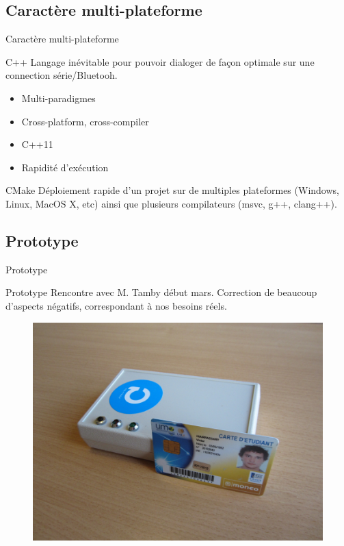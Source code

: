 \subsection{Caractère multi-plateforme}
\begin{frame}{Caractère multi-plateforme}
	\begin{block}{C++}
        Langage inévitable pour pouvoir dialoger de façon optimale sur une connection
        série/Bluetooh.

	    \begin{itemize}
            \item Multi-paradigmes
            \item Cross-platform, cross-compiler
            \item C++11
            \item Rapidité d'exécution
	    \end{itemize}
	\end{block}

	\begin{block}{CMake}
        Déploiement rapide d'un projet sur de multiples plateformes (Windows, Linux,
    MacOS X, etc) ainsi que plusieurs compilateurs (msvc, g++, clang++).
	\end{block}
\end{frame}


\subsection{Prototype}
\begin{frame}{Prototype}
	\begin{block}{Prototype}
        Rencontre avec M. Tamby début mars. Correction de beaucoup d'aspects négatifs,
        correspondant à nos besoins réels.
	\end{block}

    \begin{figure}[h]
        \begin{center}
            \includegraphics[scale=0.4]{images/proto.jpg} 
        \end{center}
     \end{figure} 
\end{frame}


